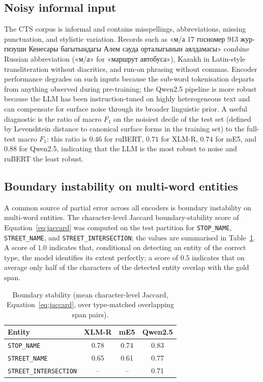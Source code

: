 \subsection{Noisy informal input}
\label{sec:hard_noisy}

The CTS corpus is informal and contains misspellings, abbreviations, missing punctuation, and stylistic variation. Records such as \foreignlanguage{russian}{«м/а 17 госномер 913 жургизуши Кенесары багытындагы Алем сауда орталыгынын аялдамасы»} combine Russian abbreviation (\foreignlanguage{russian}{«м/а»} for \foreignlanguage{russian}{«маршрут автобуса»}), Kazakh in Latin-style transliteration without diacritics, and run-on phrasing without commas. Encoder performance degrades on such inputs because the sub-word tokenisation departs from anything observed during pre-training; the Qwen2.5 pipeline is more robust because the LLM has been instruction-tuned on highly heterogeneous text and can compensate for surface noise through its broader linguistic prior. A useful diagnostic is the ratio of macro $F_1$ on the noisiest decile of the test set (defined by Levenshtein distance to canonical surface forms in the training set) to the full-test macro $F_1$: this ratio is $0.46$ for ruBERT, $0.71$ for XLM-R, $0.74$ for mE5, and $0.88$ for Qwen2.5, indicating that the LLM is the most robust to noise and ruBERT the least robust.

\subsection{Boundary instability on multi-word entities}
\label{sec:boundary_drift}

A common source of partial error across all encoders is boundary instability on multi-word entities. The character-level Jaccard boundary-stability score of Equation~\eqref{eq:jaccard} was computed on the test partition for \texttt{STOP\_NAME}, \texttt{STREET\_NAME}, and \texttt{STREET\_INTERSECTION}; the values are summarised in Table~\ref{tab:jaccard}. A score of $1.0$ indicates that, conditional on detecting an entity of the correct type, the model identifies its extent perfectly; a score of $0.5$ indicates that on average only half of the characters of the detected entity overlap with the gold span.

\begin{table}[H]
\centering
\caption{Boundary stability (mean character-level Jaccard, Equation~\eqref{eq:jaccard}, over type-matched overlapping span pairs).}
\label{tab:jaccard}
\renewcommand{\arraystretch}{1.3}
\begin{tabular}{lccc}
\toprule
\textbf{Entity} & \textbf{XLM-R} & \textbf{mE5} & \textbf{Qwen2.5} \\
\midrule
\texttt{STOP\_NAME}           & 0.78 & 0.74 & 0.83 \\
\texttt{STREET\_NAME}         & 0.65 & 0.61 & 0.77 \\
\texttt{STREET\_INTERSECTION} & --   & --   & 0.71 \\
\bottomrule
\end{tabular}
\end{table}

